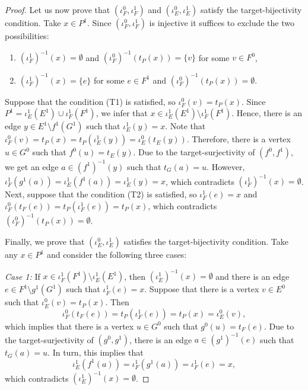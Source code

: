 \documentclass[12pt,times,a4paper]{amsart}
\numberwithin{equation}{section}
\numberwithin{equation}{section}
\begin{document}
\begin{proof}
Let us now prove that $(\iota_F^0,\iota_F^1)$ and $(\iota_E^0,\iota_E^1)$ satisfy the target-bijectivity condition. Take $x\in P^1$. 
Since $(\iota_F^0,\iota^1_F)$ is injective it suffices to exclude the two possibilities:
\begin{enumerate}
\item[(T1)] $(\iota_F^1)^{-1}(x)=\emptyset$ and $(\iota_F^0)^{-1}(t_P(x))=\{v\}$ for some $v\in F^0$,
\item[(T2)] $(\iota_F^1)^{-1}(x)=\{e\}$ for some $e\in F^1$ and $(\iota_F^0)^{-1}(t_P(x))=\emptyset$.
\end{enumerate}
Suppose that the condition (T1) is satisfied, so $\iota_F^0(v)=t_P(x)$. Since $P^1=\iota_E^1(E^1)\cup\iota_F^1(F^1)$, 
we infer that $x\in\iota_E^1(E^1)\setminus\iota_F^1(F^1)$. 
Hence, there is an edge $y\in E^1\setminus f^1(G^1)$ such that $\iota^1_E(y)=x$. Note that 
$\iota_F^0(v)=t_P(x)=t_P(\iota_E^1(y))=\iota_E^0(t_E(y))$.
Therefore, there is a vertex $u\in G^0$ such that $f^0(u)=t_E(y)$. Due to the target-surjectivity of $(f^0,f^1)$, we 
get an edge $a\in (f^1)^{-1}(y)$ such that $t_G(a)=u$. However, $\iota^1_F(g^1(a))=\iota^1_E(f^1(a))=\iota^1_E(y)=x$,
which contradicts $(\iota_F^1)^{-1}(x)=\emptyset$. Next, suppose that the condition (T2) is satisfied, so
$\iota_F^1(e)=x$ and $\iota_F^0(t_F(e))=t_P(\iota_F^1(e))=t_P(x)$, which contradicts 
$(\iota_F^0)^{-1}(t_P(x))=\emptyset$.

Finally, we prove that $(\iota_E^0,\iota_E^1)$ satisfies the target-bijectivity condition. 
Take any $x\in P^1$ and consider the following three cases:

\emph{Case 1:}
If $x\in\iota_F^1(F^1)\setminus \iota_E^1(E^1)$, then $(\iota^1_E)^{-1}(x)=\emptyset$ and there is an edge 
$e\in F^1\setminus g^1(G^1)$ such that $\iota_F^1(e)=x$. Suppose that there is a vertex $v\in E^0$ such that 
$\iota_E^0(v)=t_P(x)$. Then
\begin{equation}
\iota_F^0(t_F(e))=t_P(\iota_F^1(e))=t_P(x)=\iota_E^0(v),
\end{equation}
which implies that there is a vertex $u\in G^0$ such that $g^0(u)=t_F(e)$. Due to the target-surjectivity of 
$(g^0,g^1)$, there is an edge $a\in (g^1)^{-1}(e)$ such that $t_G(a)=u$. In turn, this implies that 
\begin{equation}
\iota_E^1(f^1(a))=\iota_F^1(g^1(a))=\iota_F^1(e)=x,
\end{equation}
which contradicts $(\iota_E^1)^{-1}(x)=\emptyset$.


\end{proof}
\end{document}
